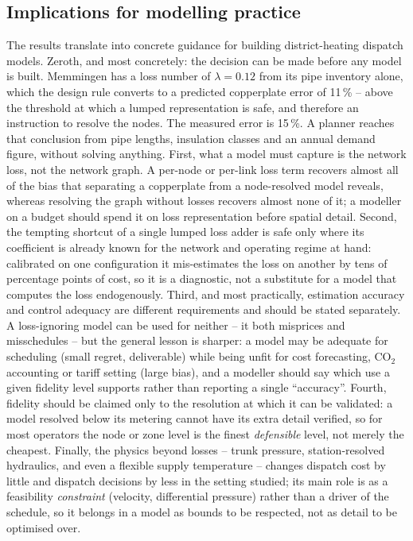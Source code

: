 \documentclass[a4paper,fleqn]{cas-dc}
\begin{document}
\subsection{Implications for modelling practice}
The results translate into concrete guidance for building district-heating dispatch models.
Zeroth, and most concretely: the decision can be made before any model is built. Memmingen has a loss number of $\lambda=0.12$ from its pipe inventory alone, which the design rule converts to a predicted copperplate error of 11\,\% -- above the threshold at which a lumped representation is safe, and therefore an instruction to resolve the nodes. The measured error is 15\,\%. A planner reaches that conclusion from pipe lengths, insulation classes and an annual demand figure, without solving anything. First, what a model must capture is the network loss, not the network graph. A per-node or
per-link loss term recovers almost all of the bias that separating a copperplate from a
node-resolved model reveals, whereas resolving the graph without losses recovers almost none
of it; a modeller on a budget should spend it on loss representation before spatial detail.
Second, the tempting shortcut of a single lumped loss adder is safe only where its coefficient
is already known for the network and operating regime at hand: calibrated on one configuration
it mis-estimates the loss on another by tens of percentage points of cost, so it is a
diagnostic, not a substitute for a model that computes the loss endogenously. Third, and most
practically, estimation accuracy and control adequacy are different requirements and should be
stated separately. A loss-ignoring model can be used for neither -- it both misprices and
misschedules -- but the general lesson is sharper: a model may be adequate for scheduling
(small regret, deliverable) while being unfit for cost forecasting, CO$_2$ accounting or tariff
setting (large bias), and a modeller should say which use a given fidelity level supports rather
than reporting a single ``accuracy''. Fourth, fidelity should be claimed only to the resolution
at which it can be validated: a model resolved below its metering cannot have its extra detail
verified, so for most operators the node or zone level is the finest \emph{defensible} level,
not merely the cheapest. Finally, the physics beyond losses -- trunk pressure, station-resolved
hydraulics, and even a flexible supply temperature -- changes dispatch cost by little and
dispatch decisions by less in the setting studied; its main role is as a feasibility
\emph{constraint} (velocity, differential pressure) rather than a driver of the schedule, so it
belongs in a model as bounds to be respected, not as detail to be optimised over.

\end{document}
